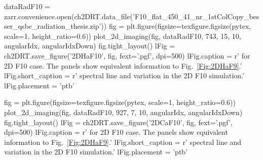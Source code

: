 \begin{pycode}[2DRT]
dataRadF10 = zarr.convenience.open(ch2DRT.data_file('F10_flat_450_41_nr_1stColCopy_besser_qsbc_radiation_thesis.zip'))
fig = plt.figure(figsize=texfigure.figsize(pytex, scale=1, height_ratio=0.6))
plot_2d_imaging(fig, dataRadF10, 743, 15, 10, angularIdx, angularIdxDown)
fig.tight_layout()
lFig = ch2DRT.save_figure('2DHaF10', fig, fext='.pgf', dpi=500)
lFig.caption = r'\Ha{} for 2D F10 case. The panels show equivalent information to Fig.~\ref{Fig:2DHaF9}.'
lFig.short_caption = r'\Ha{} spectral line and variation in the 2D F10 simulation.'
lFig.placement = 'ptb'
\end{pycode}


\begin{pycode}[2DRT]
fig = plt.figure(figsize=texfigure.figsize(pytex, scale=1, height_ratio=0.6))
plot_2d_imaging(fig, dataRadF10, 927, 7, 10, angularIdx, angularIdxDown)
fig.tight_layout()
lFig = ch2DRT.save_figure('2DCaF10', fig, fext='.pgf', dpi=500)
lFig.caption = r'\CaLine{} for 2D F10 case. The panels show equivalent information to Fig.~\ref{Fig:2DHaF9}.'
lFig.short_caption = r'\CaLine{} spectral line and variation in the 2D F10 simulation.'
lFig.placement = 'ptb'
\end{pycode}

